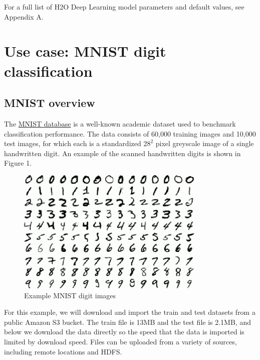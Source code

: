 For a full list of H2O Deep Learning model parameters and default values, see Appendix A.   %

\section{Use case: MNIST digit classification} 


\subsection{MNIST overview} 

The \href{http://yann.lecun.com/exdb/mnist/}{MNIST database} is a well-known academic dataset used to benchmark classification performance.  The data consists of 60,000 training images and 10,000 test images, for which each is a standardized $28^2$ pixel greyscale image of a single handwritten digit.  An example of the scanned handwritten digits is shown in Figure 1. 

\begin{figure}[ht!]
\centering
\includegraphics[width=90mm]{./images/mnistdigits.jpg}
\caption{Example MNIST digit images \label{overflow}}
\end{figure}


For this example, we will download and import the train and test datasets from a public Amazon S3 bucket. %
The train file is 13MB and the test file is 2.1MB, and below we download the data directly so the speed that the data is imported is limited by download speed.  Files can be uploaded from a variety of sources, including remote locations and HDFS.

\newpage
\waterExampleInR


